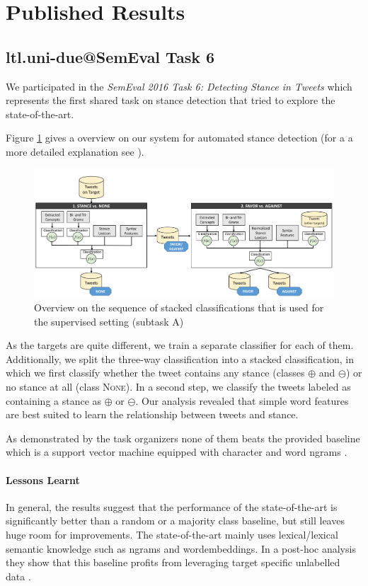 \documentclass[11pt]{article}
\begin{document}
\section{Published Results}
\subsection{ltl.uni-due@SemEval Task 6 \cite{wojatzki2016stance}}
We participated in the \textit{\mbox{SemEval} 2016 Task 6: Detecting Stance in Tweets} which represents the first shared task on stance detection that tried to explore the state-of-the-art.

Figure \ref{fig:sketch1} gives a overview on our system for automated stance detection (for a a more detailed explanation see ).

\begin{figure}
  \centering
  \includegraphics[scale=0.25]{figures/stance_skizze_new.png}
  \caption{Overview on the sequence of stacked classifications that is used for the supervised setting (subtask A)}
  \label{fig:sketch1}
\end{figure}


As the targets are quite different, we train a separate classifier for each of them. 
Additionally, we split the three-way classification into a stacked classification, in which we first classify whether the tweet contains any stance (classes $\oplus$ and $\ominus$) or no stance at all (class \textsc{None}).
In a second step, we classify the tweets labeled as containing a stance as $\oplus$ or $\ominus$.
Our analysis revealed that simple word features are best suited to learn the relationship between tweets and stance.

As demonstrated by the task organizers none of them beats the provided baseline which is  a support vector machine equipped with character and word ngrams \cite{StanceSemEval2016}.


\paragraph{Lessons Learnt}
In general, the results suggest that the performance of the state-of-the-art is significantly better than a random or a majority class baseline, but still leaves huge room for improvements. 
The state-of-the-art mainly uses lexical/lexical semantic knowledge such as ngrams and wordembeddings.
In a post-hoc analysis they show that this baseline profits from leveraging target specific unlabelled data \cite{mohammad2016stance}.
\end{document}
